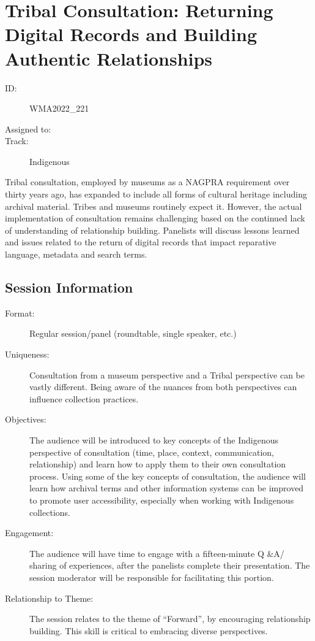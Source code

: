 \documentclass{report}
\begin{document}
              
        
          \newpage
          \section{ Tribal Consultation: Returning Digital Records and Building Authentic Relationships  }
            \begin{description}
              \item [ID:]
              WMA2022\_221

              \item [Assigned to:]
                \item [Track:]Indigenous~
              \end{description}

              Tribal consultation, employed by museums as a NAGPRA requirement over thirty years ago, has expanded to include all forms of cultural heritage including archival material. Tribes and museums routinely expect it. However, the actual implementation of consultation remains challenging based on the continued lack of understanding of relationship building. Panelists will discuss lessons learned and issues related to the return of digital records that impact reparative language, metadata and search terms.

              \subsection*{Session Information}
                \begin{description}
                  \item [Format:] Regular session/panel (roundtable, single speaker, etc.)
							    
							    \item [Uniqueness:]Consultation from a museum perspective and a Tribal perspective can be vastly different. Being aware of the nuances from both perspectives can influence collection practices.
							    \item [Objectives:]The audience will be introduced to key concepts of the Indigenous perspective of consultation (time, place, context, communication, relationship) and learn how to apply them to their own consultation process.
Using some of the key concepts of consultation, the audience will learn how archival terms and other information systems can be improved to promote user accessibility, especially when working with Indigenous collections.
							    \item [Engagement:]The audience will have time to engage with a fifteen-minute Q \&A/ sharing of experiences, after the panelists complete their presentation. The session moderator will be responsible for facilitating this portion.
							    \item [Relationship to Theme:]The session relates to the theme of “Forward”, by encouraging relationship building. This skill is critical to embracing diverse perspectives.
							    
                \end{description}
\end{document}

